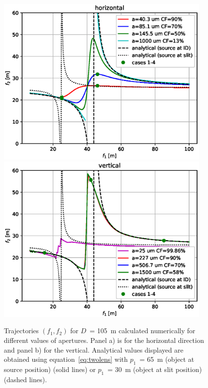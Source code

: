 \documentclass{iucr}              %
\newcommand{\inblue}[1]{{\color{blue}#1}}
\newcommand{\inred}[1]{{\color{red}#1}}
\begin{document}
\begin{figure}\label{fig:f1f2map}
    \centering
    
    \includegraphics[width=0.95\textwidth]{figures/f1f2_h.eps}
    \includegraphics[width=0.95\textwidth]{figures/f1f2_v.eps}

    \caption{Trajectories $(f_1,f_2)$ for $D$~= \SI{105}{\meter} calculated numerically for different values of apertures. Panel a) is for the horizontal direction and panel b) for the vertical. 
    Analytical values displayed are obtained using equation~\ref{eq:twolens} with $p_1$~= \SI{65}{\meter} (object at source position) (solid lines) or $p_1$~= \SI{30}{\meter} (object at slit position) (dashed lines). 
    }
\end{figure}
\end{document}

